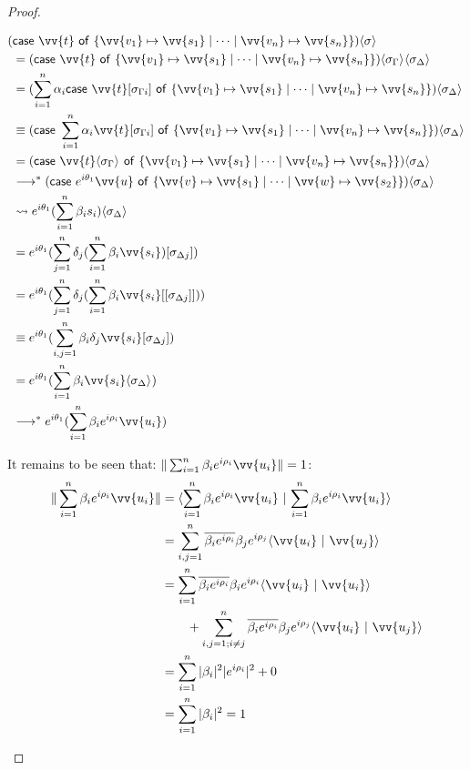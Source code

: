 \documentclass[runningheads,orivec,envcountsame,envcountsect]{llncs}
\newcommand\lra{\longrightarrow}
\newcommand\ansubst[2]{\ensuremath{\langle #1 \rangle_{#2}}}
\def\scal#1#2{\langle{#1}~|~{#2}\rangle}
\def\gencase#1#2#3#4#5{\ensuremath{\mathsf{case}~#1~\mathsf{of}~\{#2\mapsto #4 \mid \dotsb \mid #3\mapsto #5\}}}
\def\lraneq{\rightsquigarrow}
\def\eval{\lra^*}
\begin{document}
\begin{proof}
\begin{description}
    \begin{align*}
        (&\gencase{\vv{t}}{\vv{v_1}}{\vv{v_n}}{\vv{s_1}}{\vv{s_n}})\ansubst{\sigma}{}\\ 
        &= (\gencase{\vv{t}}{\vv{v_1}}{\vv{v_n}}{\vv{s_1}}{\vv{s_n}})\ansubst{\sigma_\Gamma}{}\ansubst{\sigma_\Delta}{}\\
        &=(\sum_{i=1}^{n}\alpha_i \gencase{\vv{t}[\sigma_{\Gamma i}]}{\vv{v_1}}{\vv{v_n}}{\vv{s_1}}{\vv{s_n}})\ansubst{\sigma_\Delta}{} \\
        &\equiv (\gencase{\sum_{i=1}^{n} \alpha_i \vv{t}[\sigma_{\Gamma i}]}{\vv {v_1}}{\vv{v_n}}{\vv{s_1}}{\vv{s_n}})\ansubst{\sigma_\Delta}{}\\
        &=(\gencase{\vv{t}\ansubst{\sigma_\Gamma}{}}{\vv{v_1}}{\vv{v_n}}{\vv{s_1}}{\vv{s_n}})\ansubst{\sigma_\Delta}{}\\
        &\eval(\gencase{e^{i\theta_1} \vv{u}}{\vv{v}}{\vv{w}}{\vv{s_1}}{\vv{s_2}})\ansubst{\sigma_\Delta}{}\\
        &\lraneq e^{i\theta_1} (\sum_{i=1}^{n}\beta_i s_i)\ansubst{\sigma_\Delta}{}\\
        &= e^{i\theta_1} (\sum_{j=1}^{n}\delta_j (\sum_{i=1}^{n}\beta_i \vv{s_i})[\sigma_{\Delta j}])\\
        &= e^{i\theta_1} (\sum_{j=1}^{n}\delta_j (\sum_{i=1}^{n}\beta_i \vv{s_i}[[\sigma_{\Delta j}]]))\\
        &\equiv e^{i\theta_1} (\sum_{i,j=1}^{n}\beta_i\delta_j\vv{s_i}[\sigma_{\Delta j}])\\
        &= e^{i\theta_1} (\sum_{i=1}^{n}\beta_i \vv{s_i}\ansubst{\sigma_\Delta}{})\\
        &\eval e^{i\theta_1} (\sum_{i=1}^{n}\beta_i e^{i\rho_i} \vv{u_i})
    \end{align*}
    
    It remains to be seen that: $\|\sum_{i=1}^{n}\beta_i e^{i\rho_i} \vv{u_i}\|=1$:
    \begin{align*}
        \|\sum_{i=1}^{n}\beta_i e^{i\rho_i} \vv{u_i}\| &= \scal{\sum_{i=1}^{n}\beta_i e^{i\rho_i} \vv{u_i}}{\sum_{i=1}^{n}\beta_i e^{i\rho_i} \vv{u_i}}\\
        &= \sum_{i,j=1}^{n}\overline{\beta_i e^{i\rho_i}}\beta_j e^{i\rho_j} \scal{\vv{u_i}}{\vv{u_j}}\\
        &= \sum_{i=1}^{n}\overline{\beta_i e^{i\rho_i}}\beta_i e^{i\rho_i} \scal{\vv{u_i}}{\vv{u_i}}\\
        &\qquad + \sum_{i,j=1; i\neq j}^{n}\overline{\beta_i e^{i\rho_i}}\beta_j e^{i\rho_j} \scal{\vv{u_i}}{\vv{u_j}}\\
        &= \sum_{i=1}^{n}|\beta_i|^2 |e^{i\rho_i}|^2  + 0\\
        &= \sum_{i=1}^{n}|\beta_i|^2 = 1
    \end{align*}


\end{description}
\end{proof}
\end{document}
